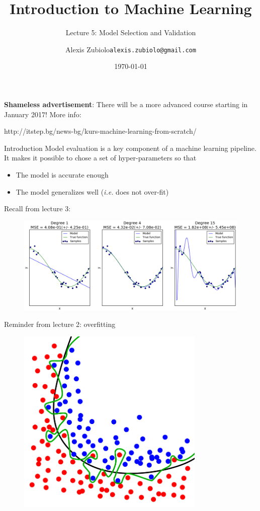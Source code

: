 \documentclass{beamer}
\title[Classification]{Introduction to Machine Learning}
\subtitle{Lecture 5: Model Selection and Validation}
\author{Alexis Zubiolo\newline\texttt{alexis.zubiolo@gmail.com}}
\institute{Data Science Team Lead @ Adcash}
\date{\today}
\newcommand{\1}[1]{\mathbbm{1}\left[#1\right]}
\begin{document}
\begin{frame}
  \titlepage
\end{frame}

\begin{frame}
\textbf{Shameless advertisement}: There will be a more advanced course starting in January 2017!
\vfill
More info:
\begin{center}
http://itstep.bg/news-bg/kurs-machine-learning-from-scratch/
\end{center}
\end{frame}

\begin{frame}{Introduction}
Model evaluation is a key component of a machine learning pipeline.
\pause
\vfill
It makes it possible to chose a set of hyper-parameters so that
\begin{itemize}
	\item The model is accurate enough
	\item The model generalizes well (\textit{i.e.} does not over-fit)
\end{itemize}
\vfill
\pause
Recall from lecture 3:
\begin{figure}
\centering
\includegraphics[width=\textwidth]{images/over_under_fitting.png}
\end{figure}
\end{frame}

\begin{frame}{Reminder from lecture 2: overfitting}
\begin{figure}
\centering
\includegraphics[width=0.8\textwidth]{images/overfitting.png}
\end{figure}
\end{frame}
\end{document}
